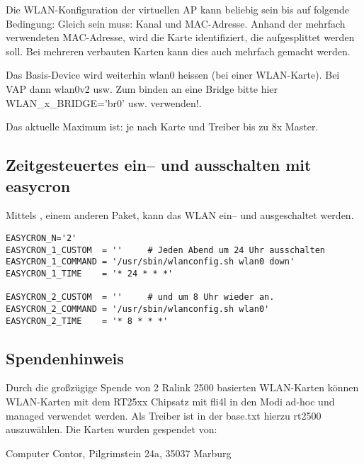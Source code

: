 Die WLAN-Konfiguration der virtuellen AP kann beliebig sein bis auf folgende Bedingung: Gleich sein muss: Kanal und MAC-Adresse.
Anhand der mehrfach verwendeten MAC-Adresse, wird die Karte identifiziert, die aufgesplittet werden soll.
Bei mehreren verbauten Karten kann dies auch mehrfach gemacht werden.

Das Basis-Device wird weiterhin wlan0 heissen (bei einer WLAN-Karte). Bei VAP dann wlan0v2 usw.
Zum binden an eine Bridge bitte hier WLAN\_x\_BRIDGE='br0' usw. verwenden!.

Das aktuelle Maximum ist: je nach Karte und Treiber bis zu 8x Master.

\subsection{Zeitgesteuertes ein-- und ausschalten mit easycron}

Mittels , einem anderen Paket, kann das WLAN ein--
und ausgeschaltet werden.

\begin{example}
\begin{verbatim}
EASYCRON_N='2'
EASYCRON_1_CUSTOM  = ''     # Jeden Abend um 24 Uhr ausschalten
EASYCRON_1_COMMAND = '/usr/sbin/wlanconfig.sh wlan0 down'
EASYCRON_1_TIME    = '* 24 * * *'

EASYCRON_2_CUSTOM  = ''     # und um 8 Uhr wieder an.
EASYCRON_2_COMMAND = '/usr/sbin/wlanconfig.sh wlan0'
EASYCRON_2_TIME    = '* 8 * * *'
\end{verbatim}
\end{example}

\subsection{Spendenhinweis}

Durch die großzügige Spende von 2 Ralink 2500 basierten WLAN-Karten können
WLAN-Karten mit dem RT25xx Chipsatz mit fli4l in den Modi ad-hoc und managed
verwendet werden. Als Treiber ist in der base.txt hierzu rt2500 auszuwählen.
Die Karten wurden gespendet von:

Computer Contor, Pilgrimstein 24a, 35037 Marburg
